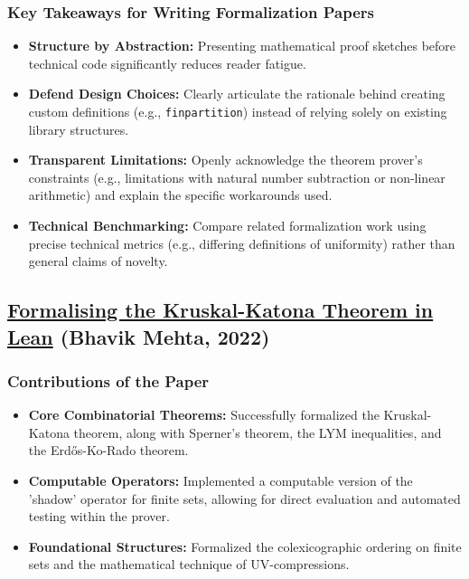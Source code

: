 \documentclass{article}
\begin{document}
\subsubsection{Key Takeaways for Writing Formalization Papers}
\begin{itemize}
    \item \textbf{Structure by Abstraction:} Presenting mathematical proof sketches before technical code significantly reduces reader fatigue.
    \item \textbf{Defend Design Choices:} Clearly articulate the rationale behind creating custom definitions (e.g., \texttt{finpartition}) instead of relying solely on existing library structures.
    \item \textbf{Transparent Limitations:} Openly acknowledge the theorem prover's constraints (e.g., limitations with natural number subtraction or non-linear arithmetic) and explain the specific workarounds used.
    \item \textbf{Technical Benchmarking:} Compare related formalization work using precise technical metrics (e.g., differing definitions of uniformity) rather than general claims of novelty.
\end{itemize}

\subsection{\href{https://link.springer.com/chapter/10.1007/978-3-031-16681-5_5}{\textbf{Formalising the Kruskal-Katona Theorem in Lean}} (Bhavik Mehta, 2022)}

\subsubsection{Contributions of the Paper}
\begin{itemize}
    \item \textbf{Core Combinatorial Theorems:} Successfully formalized the Kruskal-Katona theorem, along with Sperner's theorem, the LYM inequalities, and the Erd\H{o}s-Ko-Rado theorem.
    \item \textbf{Computable Operators:} Implemented a computable version of the 'shadow' operator for finite sets, allowing for direct evaluation and automated testing within the prover.
    \item \textbf{Foundational Structures:} Formalized the colexicographic ordering on finite sets and the mathematical technique of UV-compressions.
\end{itemize}
\end{document}
